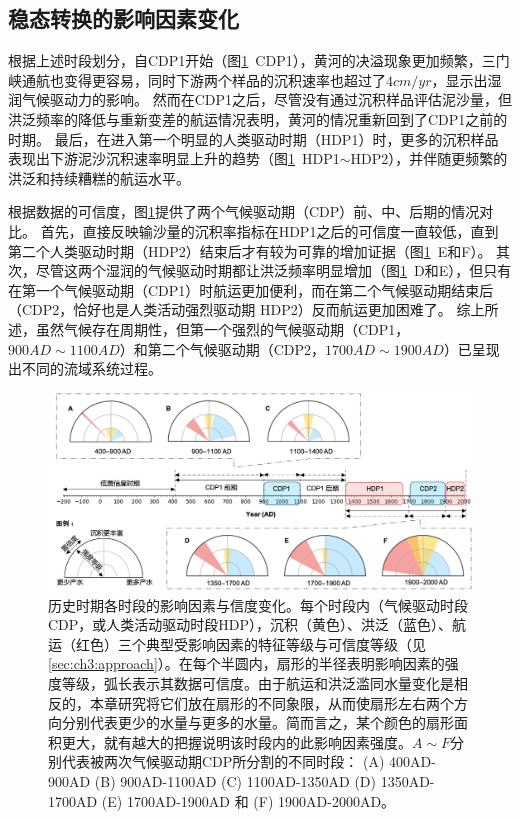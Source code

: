 \subsection{稳态转换的影响因素变化}

根据上述时段划分，自CDP1开始（图\ref{fig:ch3:impacts}~CDP1），黄河的决溢现象更加频繁，三门峡通航也变得更容易，同时下游两个样品的沉积速率也超过了$4cm/yr$，显示出湿润气候驱动力的影响。
然而在CDP1之后，尽管没有通过沉积样品评估泥沙量，但洪泛频率的降低与重新变差的航运情况表明，黄河的情况重新回到了CDP1之前的时期。
最后，在进入第一个明显的人类驱动时期（HDP1）时，更多的沉积样品表现出下游泥沙沉积速率明显上升的趋势（图\ref{fig:ch3:impacts}~HDP1$\sim$HDP2），并伴随更频繁的洪泛和持续糟糕的航运水平。


根据数据的可信度，图\ref{fig:ch3:impacts}提供了两个气候驱动期（CDP）前、中、后期的情况对比。
首先，直接反映输沙量的沉积率指标在HDP1之后的可信度一直较低，直到第二个人类驱动时期（HDP2）结束后才有较为可靠的增加证据（图\ref{fig:ch3:impacts}~E和F）。
其次，尽管这两个湿润的气候驱动时期都让洪泛频率明显增加（图\ref{fig:ch3:impacts}~D和E），但只有在第一个气候驱动期（CDP1）时航运更加便利，而在第二个气候驱动期结束后（CDP2，恰好也是人类活动强烈驱动期 HDP2）反而航运更加困难了。
综上所述，虽然气候存在周期性，但第一个强烈的气候驱动期（CDP1，$900AD\sim1100AD$）和第二个气候驱动期（CDP2，$1700AD\sim1900AD$）已呈现出不同的流域系统过程。

\begin{figure}[htb] %
    \includegraphics[width=\textwidth]{img/ch3/ch3_impacts.png}
    \caption[历史时期各时段的影响因素与信度变化]{历史时期各时段的影响因素与信度变化。每个时段内（气候驱动时段CDP，或人类活动驱动时段HDP），沉积（黄色）、洪泛（蓝色）、航运（红色）三个典型受影响因素的特征等级与可信度等级（见\ref{sec:ch3:approach}）。在每个半圆内，扇形的半径表明影响因素的强度等级，弧长表示其数据可信度。由于航运和洪泛滥同水量变化是相反的，本章研究将它们放在扇形的不同象限，从而使扇形左右两个方向分别代表更少的水量与更多的水量。简而言之，某个颜色的扇形面积更大，就有越大的把握说明该时段内的此影响因素强度。$A \sim F$分别代表被两次气候驱动期CDP所分割的不同时段： (A) 400AD-900AD (B) 900AD-1100AD (C) 1100AD-1350AD (D) 1350AD-1700AD (E) 1700AD-1900AD 和 (F) 1900AD-2000AD。}\label{fig:ch3:impacts}
\end{figure}
